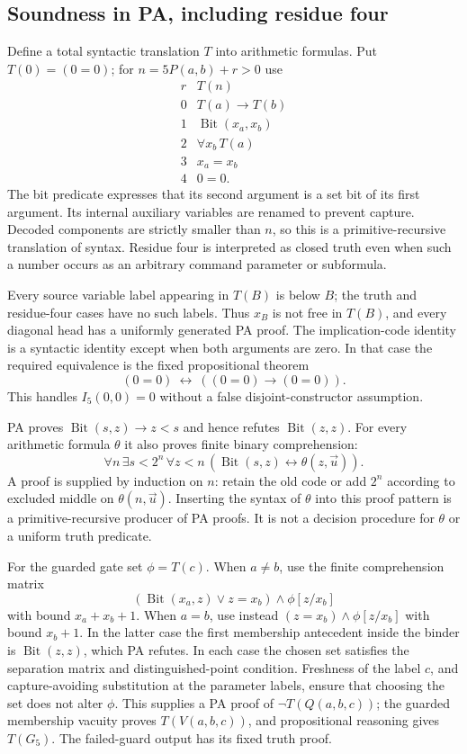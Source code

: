 \subsection{Soundness in PA, including residue four}

Define a total syntactic translation $T$ into arithmetic formulas. Put
$T(0)=(0=0)$; for $n=5P(a,b)+r>0$ use
\[
\begin{array}{c|l}
 r&T(n)\\\hline
 0&T(a)\to T(b)\\
 1&\operatorname{Bit}(x_a,x_b)\\
 2&\forall x_b\,T(a)\\
 3&x_a=x_b\\
 4&0=0.
\end{array}
\]
The bit predicate expresses that its second argument is a set bit of its
first argument. Its internal auxiliary variables are renamed to prevent
capture. Decoded components are strictly smaller than $n$, so this is a
primitive-recursive translation of syntax. Residue four is interpreted as
closed truth even when such a number occurs as an arbitrary command
parameter or subformula.

Every source variable label appearing in $T(B)$ is below $B$; the truth
and residue-four cases have no such labels. Thus $x_B$ is not free in
$T(B)$, and every diagonal head has a uniformly generated PA proof.
The implication-code identity is a syntactic identity except when both
arguments are zero. In that case the required equivalence is the fixed
propositional theorem
\[
 (0=0)\ \longleftrightarrow\ ((0=0)\to(0=0)).
\]
This handles $I_5(0,0)=0$ without a false disjoint-constructor assumption.

PA proves $\operatorname{Bit}(s,z)\to z<s$ and hence refutes
$\operatorname{Bit}(z,z)$. For every arithmetic formula $\theta$ it also
proves finite binary comprehension:
\[
 \forall n\,\exists s<2^n\,\forall z<n\,
       (\operatorname{Bit}(s,z)\leftrightarrow\theta(z,\vec u)).
\]
A proof is supplied by induction on $n$: retain the old code or add $2^n$
according to excluded middle on $\theta(n,\vec u)$. Inserting the syntax
of $\theta$ into this proof pattern is a primitive-recursive producer of
PA proofs. It is not a decision procedure for $\theta$ or a uniform truth
predicate.

For the guarded gate set $\phi=T(c)$. When $a\ne b$, use the finite
comprehension matrix
\[
 (\operatorname{Bit}(x_a,z)\lor z=x_b)\wedge\phi[z/x_b]
\]
with bound $x_a+x_b+1$. When $a=b$, use instead
$(z=x_b)\wedge\phi[z/x_b]$ with bound $x_b+1$.
In the latter case the first membership antecedent inside the binder is
$\operatorname{Bit}(z,z)$, which PA refutes. In each case the chosen set
satisfies the separation matrix and distinguished-point condition.
Freshness of the label $c$, and capture-avoiding substitution at the
parameter labels, ensure that choosing the set does not alter $\phi$.
This supplies a PA proof of $\neg T(Q(a,b,c))$; the guarded membership
vacuity proves $T(V(a,b,c))$, and propositional reasoning gives $T(G_5)$.
The failed-guard output has its fixed truth proof.

